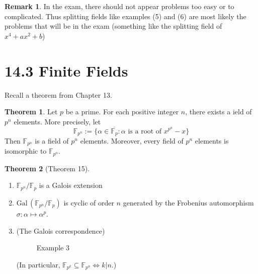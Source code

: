 \documentclass{article}
\theoremstyle{definition}
\newtheorem{thm}{Theorem}
\newtheorem{rem}{Remark}
\newcommand{\FF}{\mathbb F}
\newcommand{\Lra}{\Leftrightarrow}
\newcommand{\Gal}{\text{Gal}\,}
\begin{document}
\begin{rem}
	In the exam, there should not appear problems too easy or to complicated.
	Thus splitting fields like examples (5) and (6) are most likely the problems that will be in the exam (something like the splitting field of $x^4 + ax^2 + b$)
\end{rem}

\section*{14.3 Finite Fields}

Recall a theorem from Chapter 13.

\begin{thm}
	Let $p$ be a prime.
	For each positive integer $n$, there exists a ield of $p^n$ elements.
	More precisely, let 
	\[
		\FF_{p^n} := \{\alpha \in \overline{\FF_p}: \alpha \text{ is a root of }x^{p^n} - x\}
	\]
	Then $\FF_{p^n}$ is a field of $p^n$ elements.
	Moreover, every field of $p^n$ elements is isomorphic to $\FF_{p^n}$.
\end{thm}

\begin{thm}[Theorem 15]
	\begin{enumerate}
		\item[(1)] $\FF_{p^n}/\FF_p$ is a Galois extension

		\item[(2)] $\Gal(\FF_{p^n}/\FF_p)$ is cyclic of order $n$ generated by the Frobenius automorphism $\sigma: \alpha \mapsto \alpha^p$.

		\item[(3)] (The Galois correspondence)

				\begin{figure}[H]
					\centering
					\caption{Example 3}
				\end{figure}

			(In particular, $\FF_{p^k} \subseteq \FF_{p^n} \Lra k|n$.)
	\end{enumerate}
\end{thm}
\end{document}
